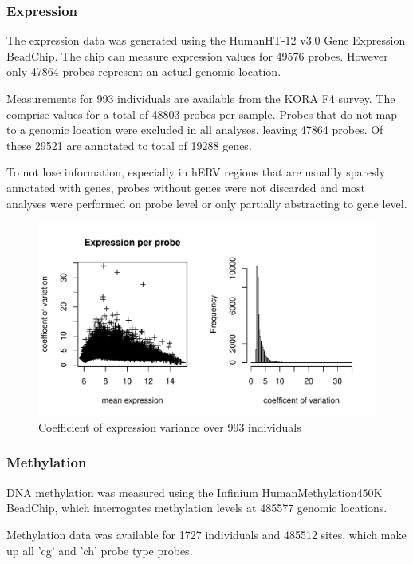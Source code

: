 \documentclass[a4paper,12pt]{article}
\begin{document}
\subsubsection{Expression}
The expression data was generated using the HumanHT-12 v3.0 Gene Expression BeadChip. The chip can measure expression values for 49576 probes. However only 47864 probes represent an actual genomic location. 

Measurements for 993 individuals are available from the KORA F4 survey. The comprise values for a total of 48803 probes per sample. Probes that do not map to a genomic location were excluded in all analyses, leaving 47864 probes. Of these 29521 are annotated to total of 19288 genes. 

To not lose information, especially in hERV regions that are usuallly sparesly annotated with genes, probes without genes were not discarded and most analyses were performed on probe level or only partially abstracting to gene level. 

\begin{figure}[tb]
	\includegraphics[scale = 1, keepaspectratio = true]{../figures/expr_var}  
	\caption{Coefficient of expression variance over 993 individuals}
    \label{fig:expr.var}
\end{figure}

\subsubsection{Methylation}
DNA methylation was measured using the Infinium HumanMethylation450K BeadChip, which interrogates methylation levels at 485577 genomic locations.  

Methylation data was available for 1727 individuals and 485512 sites, which make up all 'cg' and 'ch' probe type probes.
 
\end{document}
